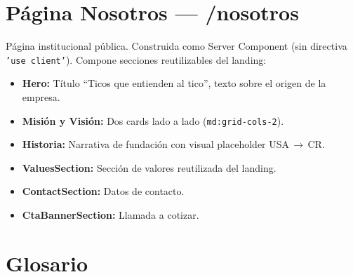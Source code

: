 \documentclass[12pt,a4paper]{article}
\begin{document}
\section{Página Nosotros --- /nosotros}

Página institucional pública. Construida como Server Component (sin directiva
\texttt{'use client'}). Compone secciones reutilizables del landing:

\begin{itemize}
  \item \textbf{Hero:} Título ``Ticos que entienden al tico'', texto sobre el origen de la empresa.
  \item \textbf{Misión y Visión:} Dos cards lado a lado (\texttt{md:grid-cols-2}).
  \item \textbf{Historia:} Narrativa de fundación con visual placeholder USA\,$\rightarrow$\,CR.
  \item \textbf{ValuesSection:} Sección de valores reutilizada del landing.
  \item \textbf{ContactSection:} Datos de contacto.
  \item \textbf{CtaBannerSection:} Llamada a cotizar.
\end{itemize}

\section*{Glosario}
\end{document}
